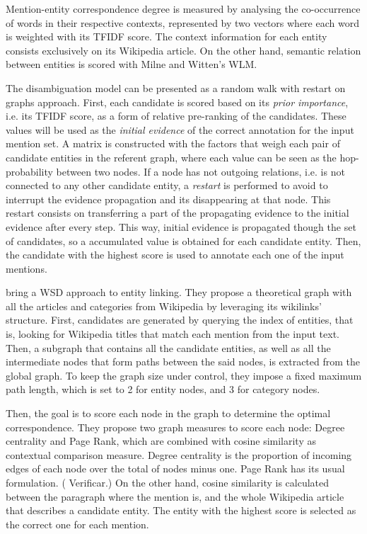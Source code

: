Mention-entity correspondence degree is measured by analysing the co-occurrence of words in their respective contexts, represented by two vectors where each word is weighted with its TFIDF score. The context information for each entity consists exclusively on its Wikipedia article. On the other hand, semantic relation between entities is scored with Milne and Witten's WLM.

The disambiguation model can be presented as a random walk with restart on graphs approach. First, each candidate is scored based on its \emph{prior importance}, i.e. its TFIDF score, as a form of relative pre-ranking of the candidates. These values will be used as the \emph{initial evidence} of the correct annotation for the input mention set. A matrix is constructed with the factors that weigh each pair of candidate entities in the referent graph, where each value can be seen as the hop-probability between two nodes. If a node has not outgoing relations, i.e. is not connected to any other candidate entity, a \emph{restart} is performed to avoid to interrupt the evidence propagation and its disappearing at that node. This restart consists on transferring a part of the propagating evidence to the initial evidence after every step. This way, initial evidence is propagated though the set of candidates, so a accumulated value is obtained for each candidate entity. Then, the candidate with the highest score is used to annotate each one of the input mentions.

\medskip

\cite{hachey2011} bring a WSD approach to entity linking. They propose a theoretical graph with all the articles and categories from Wikipedia by leveraging its wikilinks' structure. First, candidates are generated by querying the index of entities, that is, looking for Wikipedia titles that match each mention from the input text. Then, a subgraph that contains all the candidate entities, as well as all the intermediate nodes that form paths between the said nodes, is extracted from the global graph. To keep the graph size under control, they impose a fixed maximum path length, which is set to 2 for entity nodes, and 3 for category nodes.

Then, the goal is to score each node in the graph to determine the optimal correspondence. They propose two graph measures to score each node: Degree centrality and Page Rank, which are combined with cosine similarity as contextual comparison measure. Degree centrality is the proportion of incoming edges of each node over the total of nodes minus one. Page Rank has its usual formulation. ({\color{red} Verificar.}) On the other hand, cosine similarity is calculated between the paragraph where the mention is, and the whole Wikipedia article that describes a candidate entity. The entity with the highest score is selected as the correct one for each mention.

